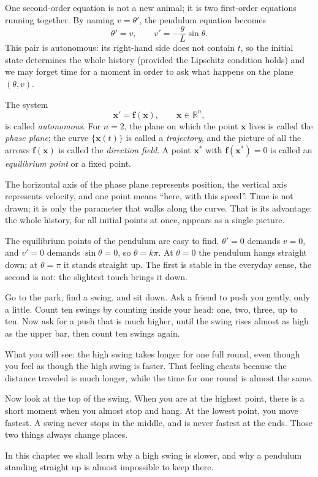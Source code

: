 One second-order equation is not a new animal; it is two first-order equations running
together. By naming $v=\theta'$, the pendulum equation becomes
\[
\theta'=v,\qquad v'=-\frac{g}{L}\sin\theta .
\]
This pair is autonomous: its right-hand side does not contain $t$, so the initial state
determines the whole history (provided the Lipschitz condition holds) and we may forget time
for a moment in order to ask what happens on the plane $(\theta,v)$.

\begin{definisi}
The system
\[
\mathbf{x}'=\mathbf{f}(\mathbf{x}),\qquad \mathbf{x}\in\mathbb{R}^{n},
\]
is called \emph{autonomous}. For $n=2$, the plane on which the point $\mathbf{x}$ lives is
called the \emph{phase plane}; the curve $\{\mathbf{x}(t)\}$ is called a
\emph{trajectory}, and the picture of all the arrows $\mathbf{f}(\mathbf{x})$ is called the
\emph{direction field}. A point $\mathbf{x}^{*}$ with $\mathbf{f}(\mathbf{x}^{*})=0$ is
called an \emph{equilibrium point} or a fixed point.
\end{definisi}

The horizontal axis of the phase plane represents position, the vertical axis represents
velocity, and one point means ``here, with this speed''. Time is not drawn; it is only the
parameter that walks along the curve. That is its advantage: the whole history, for all
initial points at once, appears as a single picture.

The equilibrium points of the pendulum are easy to find. $\theta'=0$ demands $v=0$, and
$v'=0$ demands $\sin\theta=0$, so $\theta=k\pi$. At $\theta=0$ the pendulum hangs straight
down; at $\theta=\pi$ it stands straight up. The first is stable in the everyday sense, the
second is not: the slightest touch brings it down.

\begin{untukanak}
Go to the park, find a swing, and sit down. Ask a friend to push you gently, only a little.
Count ten swings by counting inside your head: one, two, three, up to ten. Now ask for a push
that is much higher, until the swing rises almost as high as the upper bar, then count ten
swings again.

What you will see: the high swing takes longer for one full round, even though you feel as
though the high swing is faster. That feeling cheats because the distance traveled is much
longer, while the time for one round is almost the same.

Now look at the top of the swing. When you are at the highest point, there is a short moment
when you almost stop and hang. At the lowest point, you move fastest. A swing never stops in
the middle, and is never fastest at the ends. Those two things always change places.

In this chapter we shall learn why a high swing is slower, and why a pendulum standing
straight up is almost impossible to keep there.
\end{untukanak}

